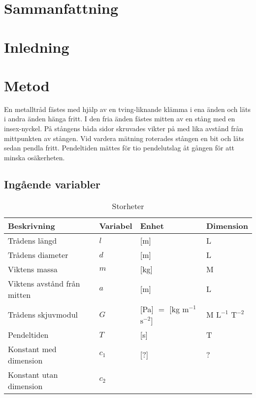 \documentclass[a4paper,12pt]{article}
\begin{document}
\section*{Sammanfattning}
\lipsum[1]

\clearpage

\tableofcontents
\clearpage

\section{Inledning}
\lipsum[1]

\section{Metod}

En metalltråd fästes med hjälp av en tving-liknande klämma i ena änden och läts
i andra änden hänga fritt. I den fria änden fästes mitten av en stång med en
insex-nyckel. På stångens båda sidor skruvades vikter på med lika avstånd från
mittpunkten av stången. Vid vardera mätning roterades stången en bit och läts
sedan pendla fritt. Pendeltiden mättes för tio pendelutslag åt gången för att
minska osäkerheten.

\subsection{Ingående variabler}

\begin{table}[h!]
  \caption{Storheter}
  \label{tab:storheter}
  \begin{tabular} {| l | l | l | l |}
    \hline
    \textbf{Beskrivning} & \textbf{Variabel} & \textbf{Enhet} & \textbf{Dimension} \\\hline
    Trådens längd & $l$ & [m] & L \\\hline
    Trådens diameter & $d$ & [m] & L \\\hline
    Viktens massa & $m$ & [kg] & M \\\hline
    Viktens avstånd från mitten & $a$ & [m] & L \\\hline
    Trådens skjuvmodul & $G$ & [Pa] $=$ [kg $\mathrm{m}^{-1}$ $\mathrm{s}^{-2}$] & M $\mathrm{L}^{-1}$ $\mathrm{T}^{-2}$ \\\hline
    Pendeltiden & $T$ & [s] & T \\\hline
    Konstant med dimension & $c_1$ & [?] & ? \\\hline
    Konstant utan dimension & $c_2$ && \\\hline
  \end{tabular}
\end{table}
\end{document}
